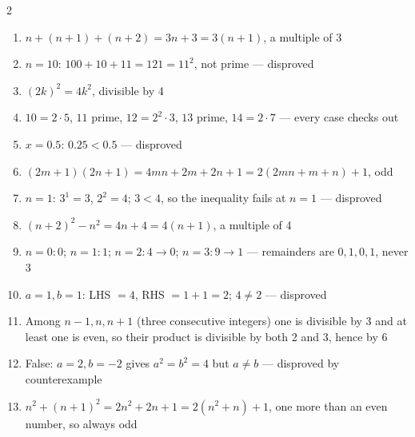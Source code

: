 \documentclass[11pt]{article}
\begin{document}
\begin{keybox}
\begin{multicols}{2}
\small
\begin{enumerate}[leftmargin=*,itemsep=3pt]
  \item $n+(n+1)+(n+2)=3n+3=3(n+1)$, a multiple of 3
  \item $n=10$: $100+10+11=121=11^2$, not prime --- disproved
  \item $(2k)^2=4k^2$, divisible by 4
  \item $10=2\cdot5$, $11$ prime, $12=2^2\cdot3$, $13$ prime, $14=2\cdot7$ --- every case checks out
  \item $x=0.5$: $0.25<0.5$ --- disproved
  \item $(2m+1)(2n+1)=4mn+2m+2n+1=2(2mn+m+n)+1$, odd
  \item $n=1$: $3^1=3$, $2^2=4$; $3<4$, so the inequality fails at $n=1$ --- disproved
  \item $(n+2)^2-n^2=4n+4=4(n+1)$, a multiple of 4
  \item $n=0:0$; $n=1:1$; $n=2:4\to0$; $n=3:9\to1$ --- remainders are $0,1,0,1$, never 3
  \item $a=1,b=1$: LHS $=4$, RHS $=1+1=2$; $4\neq2$ --- disproved
  \item Among $n-1,n,n+1$ (three consecutive integers) one is divisible by 3 and at least one is even, so their product is divisible by both 2 and 3, hence by 6
  \item False: $a=2,b=-2$ gives $a^2=b^2=4$ but $a\neq b$ --- disproved by counterexample
  \item $n^2+(n+1)^2=2n^2+2n+1=2(n^2+n)+1$, one more than an even number, so always odd
\end{enumerate}
\end{multicols}
\end{keybox}
\end{document}
